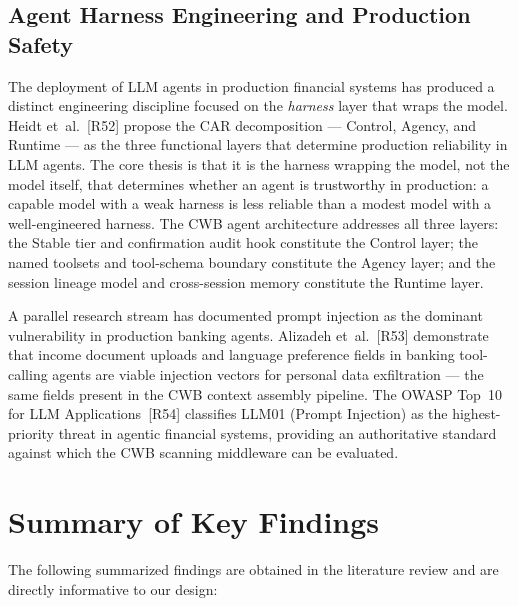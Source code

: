 \documentclass[12pt,a4paper]{report}
\begin{document}
\subsection{Agent Harness Engineering and Production Safety}
\label{sec:harness-lit}

The deployment of LLM agents in production financial systems has produced a
distinct engineering discipline focused on the \textit{harness} layer that wraps
the model. Heidt et~al.~[R52] propose the CAR decomposition ---
Control, Agency, and Runtime --- as the three functional layers that determine
production reliability in LLM agents. The core thesis is that it is the harness
wrapping the model, not the model itself, that determines whether an agent is
trustworthy in production: a capable model with a weak harness is less reliable
than a modest model with a well-engineered harness. The CWB agent architecture
addresses all three layers: the Stable tier and confirmation audit hook constitute
the Control layer; the named toolsets and tool-schema boundary constitute the
Agency layer; and the session lineage model and cross-session memory constitute
the Runtime layer.

A parallel research stream has documented prompt injection as the dominant
vulnerability in production banking agents. Alizadeh et~al.~[R53]
demonstrate that income document uploads and language preference fields in
banking tool-calling agents are viable injection vectors for personal data
exfiltration --- the same fields present in the CWB context assembly pipeline.
The OWASP Top~10 for LLM Applications~[R54] classifies LLM01 (Prompt
Injection) as the highest-priority threat in agentic financial systems, providing
an authoritative standard against which the CWB scanning middleware can be
evaluated.

\section{Summary of Key Findings}

The following summarized findings are obtained in the literature review and are directly informative to our design:
\end{document}
